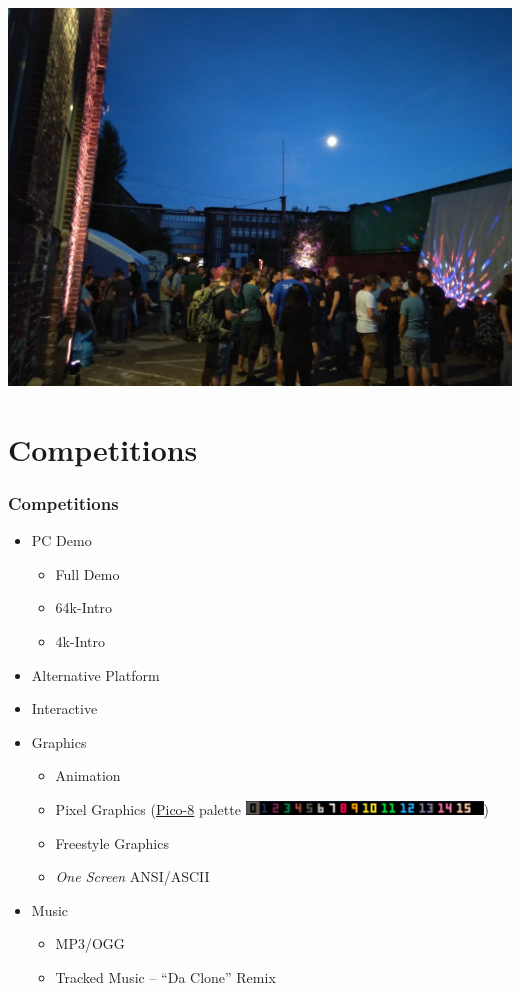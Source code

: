 \documentclass{beamer}
\begin{document}
\begin{frame}
  \includegraphics[width=\textwidth]{IMG_20180818_212407}
\end{frame}


\section{Competitions}

\begin{frame}
  \frametitle{Competitions}
  \begin{itemize}
  \item PC Demo
    \begin{itemize}
    \item Full Demo
    \item 64k-Intro
    \item 4k-Intro
    \end{itemize}
  \item Alternative Platform
  \item Interactive
  \item Graphics
    \begin{itemize}
    \item Animation
    \item Pixel Graphics (\href{https://www.lexaloffle.com/pico-8.php}{Pico-8} palette \href{https://www.romanzolotarev.com/pico-8-color-palette/}{\includegraphics[width=17em]{palette}})
    \item Freestyle Graphics
    \item \emph{One Screen} ANSI/ASCII
    \end{itemize}
  \item Music
    \begin{itemize}
    \item MP3/OGG
    \item Tracked Music -- ``Da Clone'' Remix
    \end{itemize}
  \end{itemize}
\end{frame}
\end{document}
